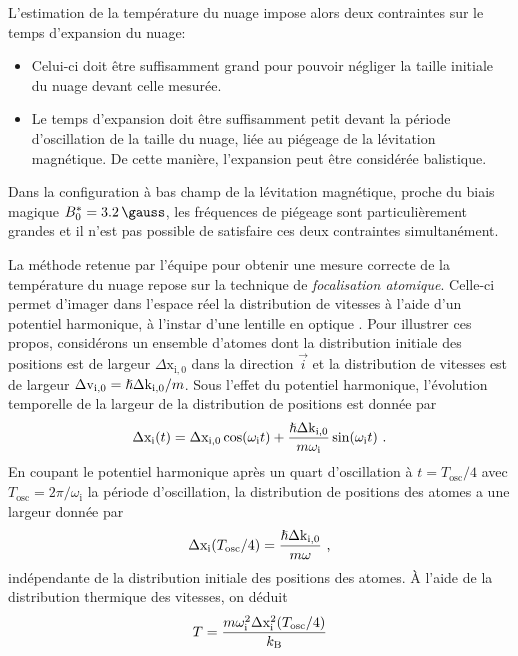 L'estimation de la température du nuage impose alors deux contraintes sur le temps d'expansion du nuage: 
\begin{itemize}
\item[\textendash] Celui-ci doit être suffisamment grand pour pouvoir négliger la taille initiale du nuage devant celle mesurée.
\item[\textendash] Le temps d'expansion doit être suffisamment petit devant la période d'oscillation de la taille du nuage, liée au piégeage de la lévitation magnétique. De cette manière, l'expansion peut être considérée balistique.
\end{itemize}
Dans la configuration à bas champ de la lévitation magnétique, proche du biais magique $\magicB=\SI{3.2}{\gauss}$, les fréquences de piégeage sont particulièrement grandes et il n'est pas possible de satisfaire ces deux contraintes simultanément. 

La méthode retenue par l'équipe pour obtenir une mesure correcte de la température du nuage repose sur la technique de \emph{focalisation atomique}. Celle-ci permet d'imager dans l'espace réel la distribution de vitesses à l'aide d'un potentiel harmonique, à l'instar d'une lentille en optique \citep{murthy2014matter}. Pour illustrer ces propos, considérons un ensemble d'atomes dont la distribution initiale des positions est de largeur $\Delta\mathrm{x}_{\mathrm{i,0}}$ dans la direction $\vec{i}$ et la distribution de vitesses est de largeur $\Delta\mathrm{v}_{\mathrm{i,0}}=\hslash \Delta\mathrm{k}_{\mathrm{i,0}} /m$. Sous l'effet du potentiel harmonique, l'évolution temporelle de la largeur de la distribution de positions est donnée par
\begin{equation}
\Delta\mathrm{x}_{\mathrm{i}}(t)=\Delta\mathrm{x}_{\mathrm{i,0}} \cos(\omega_{\mathrm{i}} t) + \frac{\hslash \Delta\mathrm{k}_{\mathrm{i,0}}}{m \omega_{\mathrm{i}}} \sin(\omega_{\mathrm{i}} t) \text{ .}
\end{equation}
En coupant le potentiel harmonique après un quart d'oscillation à $t=T_{\mathrm{osc}}/4$ avec $T_{\mathrm{osc}}= 2\pi/\omega_{\mathrm{i}}$ la période d'oscillation, la distribution de positions des atomes a une largeur donnée par
\begin{equation}
\Delta\mathrm{x}_{\mathrm{i}}(T_{\mathrm{osc}}/4)=\frac{\hslash \Delta\mathrm{k}_{\mathrm{i,0}}}{m \omega} \text{ ,}
\end{equation}
indépendante de la distribution initiale des positions des atomes. À l'aide de la distribution thermique des vitesses, on déduit
\begin{equation}
T=\frac{m \omega_{\mathrm{i}}^2 \Delta \mathrm{x}_{\mathrm{i}}^2(T_{\mathrm{osc}}/4)}{k_{\mathrm{B}}}
\end{equation}

